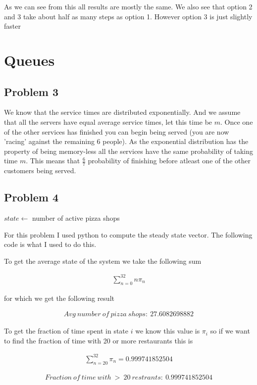 \documentclass{article}
\begin{document}
			As we can see from this all results are mostly the same. We also see that option 2 and 3 take about half as many steps as option 1. However option 3 is just slightly faster
			
	
	\section{Queues}			  			
		\subsection{Problem 3}
			We know that the service times are distributed exponentially. And we assume that all the servers have equal average service times, let this time be $m$. Once one of the other services has finished you can begin being served (you are now 'racing' against the remaining 6 people). As the exponential distribution has the property of being memory-less all the services have the same probability of taking time $m$. This means that $\frac{6}{7}$ probability of finishing before atleast one of the other customers being served.
			
		\subsection{Problem 4}
			$state \gets $ number of active pizza shops\newline
		
			For this problem I used python to compute the steady state vector. The following code is what I used to do this.
			  			
  			
			To get the average state of the system we take the following sum
			
			\begin{align*}
				\sum_{n = 0}^{32} n\pi_n
			\end{align*}			  			
  			
			for which we get the following result  			
  			
  			\begin{align*}
  				Avg\ number\ of\ pizza\ shops:\ 27.6082698882
  			\end{align*}
  			
			To get the fraction of time spent in state $i$ we know this value is $\pi_i$ so if we want to find the fraction of time with 20 or more restaurants this is
			
			\begin{align}
				\sum_{n = 20}^{32} \pi_n = 0.999741852504
			\end{align}					
  			
  			\begin{align}
  				Fraction\ of\ time\ with\ >\ 20\ restrants:\ 0.999741852504
  			\end{align}
\end{document}

